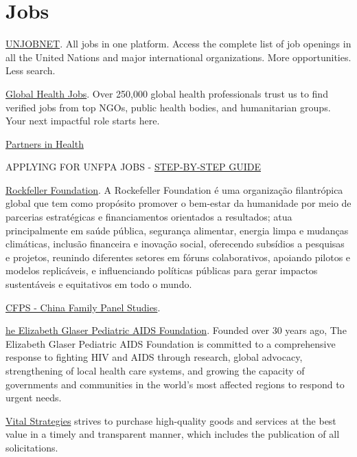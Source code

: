 \documentclass[
  letterpaper,
  DIV=11,
  numbers=noendperiod]{scrreprt}
\begin{document}
\section{Jobs}\label{jobs}

\href{https://www.unjobnet.org/}{UNJOBNET}. All jobs in one platform.
Access the complete list of job openings in all the United Nations and
major international organizations. More opportunities. Less search.

\href{https://globalhealthjobs.com/}{Global Health Jobs}. Over 250,000
global health professionals trust us to find verified jobs from top
NGOs, public health bodies, and humanitarian groups. Your next impactful
role starts here.

\href{https://www.pih.org/}{Partners in Health}

APPLYING FOR UNFPA JOBS -
\href{https://www.unfpa.org/sites/default/files/resource-pdf/Quantum\%20-\%20External\%20Application\%20Guide\%20August\%202022\%20.pdf}{STEP-BY-STEP
GUIDE}

\href{https://www.rockefellerfoundation.org/}{Rockfeller Foundation}. A
Rockefeller Foundation é uma organização filantrópica global que tem
como propósito promover o bem-estar da humanidade por meio de parcerias
estratégicas e financiamentos orientados a resultados; atua
principalmente em saúde pública, segurança alimentar, energia limpa e
mudanças climáticas, inclusão financeira e inovação social, oferecendo
subsídios a pesquisas e projetos, reunindo diferentes setores em fóruns
colaborativos, apoiando pilotos e modelos replicáveis, e influenciando
políticas públicas para gerar impactos sustentáveis e equitativos em
todo o mundo.

\href{https://cfpsdata.pku.edu.cn/\#/home}{CFPS - China Family Panel
Studies}.

\href{https://pedaids.org/}{he Elizabeth Glaser Pediatric AIDS
Foundation}. Founded over 30 years ago, The Elizabeth Glaser Pediatric
AIDS Foundation is committed to a comprehensive response to fighting HIV
and AIDS through research, global advocacy, strengthening of local
health care systems, and growing the capacity of governments and
communities in the world's most affected regions to respond to urgent
needs.

\href{https://www.vitalstrategies.org/about-us/business-and-consulting-opportunities/}{Vital
Strategies} strives to purchase high-quality goods and services at the
best value in a timely and transparent manner, which includes the
publication of all solicitations.
\end{document}
